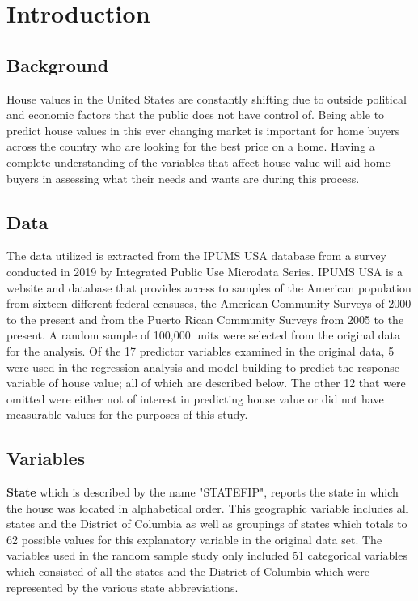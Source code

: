 \section{Introduction}
\label{sec:intro}


\subsection{Background}
House values in the United States are constantly shifting due to outside political and economic factors that the public does not have control of. Being able to predict house values in this ever changing market is important for home buyers across the country who are looking for the best price on a home. Having a complete understanding of the variables that affect house value will aid home buyers in assessing what their needs and wants are during this process.


\subsection{Data}
The data utilized is extracted from the IPUMS USA database from a survey conducted in 2019 by Integrated Public Use Microdata Series. IPUMS USA is a website and database that provides access to samples of the American population from sixteen different federal censuses, the American Community Surveys of 2000 to the present and from the Puerto Rican Community Surveys from 2005 to the present.\cite{IPUMS} A random sample of 100,000 units were selected from the original data for the analysis. Of the 17 predictor variables examined in the original data, 5 were used in the regression analysis and model building to predict the response variable of house value; all of which are described below. The other 12 that were omitted were either not of interest in predicting house value or did not have measurable values for the purposes of this study. 



\subsection{Variables}
\indent \textbf{State} which is described by the name "STATEFIP", reports the state in which the house was located in alphabetical order. This geographic variable includes all states and the District of Columbia as well as groupings of states which totals to 62 possible values for this explanatory variable in the original data set.\cite{IPUMS} The variables used in the random sample study only included 51 categorical variables which consisted of all the states and the District of Columbia which were represented by the various state abbreviations.


